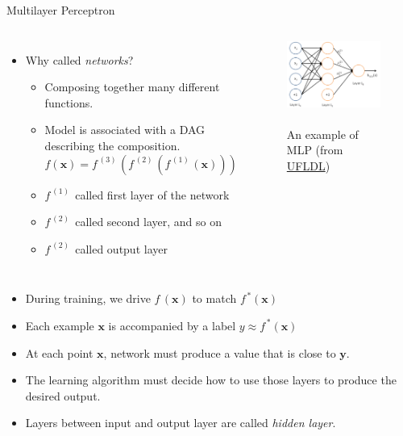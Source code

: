 \documentclass[10pt]{beamer}
\begin{document}
	\begin{frame}{Multilayer Perceptron}
		\begin{columns}[T,onlytextwidth]
			\begin{itemize}
				\item Why called \emph{networks}?
				\begin{itemize}
					\item Composing together many different functions.
					\item Model is associated with a DAG describing the composition.
					\begin{equation*}
					f(\bm{x}) = f^{\,(3)\,}(f^{\,(2)\,}(f^{\,(1)\,}(\bm{x})))
					\end{equation*}
					\item $f^{\,(1)\,}$ called first layer of the network
					\item $f^{\,(2)\,}$ called second layer, and so on
					\item $f^{\,(2)\,}$ called output layer
				\end{itemize}
			\end{itemize}
			\begin{figure}
				\includegraphics[width=10em]{figures/multilayer-perceptron.png}
				\caption{\\ An example of MLP  (from \href{http://ufldl.stanford.edu/wiki/index.php/File:Network331.png}{UFLDL})}
			\end{figure}
		\end{columns}
		\begin{itemize}
			\item During training, we drive $f\,(\bm{x})$ to match $f^{\,*}(\bm{x})$
			\item Each example $\bm{x}$ is accompanied by a label $y\approx f^{\,*}(\bm{x})$
			\item At each point $\bm{x}$, network must produce a value that is close to $\bm{y}$.
			\item The learning algorithm must decide how to use those layers to produce the desired output.
			\item Layers between input and output layer are called \emph{hidden layer}.
		\end{itemize}
	\end{frame}
\end{document}
